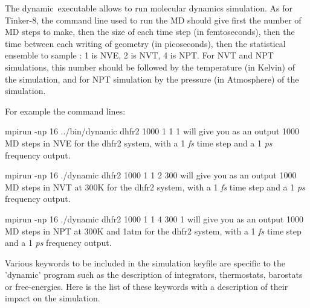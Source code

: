 The {\ttfamily dynamic} executable allows to run molecular dynamics simulation. As for Tinker-\/8, the command line used to run the M\-D should give first the number of M\-D steps to make, then the size of each time step (in femtoseconds), then the time between each writing of geometry (in picoseconds), then the statistical ensemble to sample \-: 1 is N\-V\-E, 2 is N\-V\-T, 4 is N\-P\-T. For N\-V\-T and N\-P\-T simulations, this number should be followed by the temperature (in Kelvin) of the simulation, and for N\-P\-T simulation by the pressure (in Atmosphere) of the simulation.

For example the command lines\-:


\begin{DoxyItemize}
\item {\ttfamily mpirun -\/np 16 ../bin/dynamic dhfr2 1000 1 1 1} will give you as an output 1000 M\-D steps in N\-V\-E for the dhfr2 system, with a 1 {\itshape fs} time step and a 1 {\itshape ps} frequency output.
\item {\ttfamily mpirun -\/np 16 ./dynamic dhfr2 1000 1 1 2 300} will give you as an output 1000 M\-D steps in N\-V\-T at 300\-K for the dhfr2 system, with a 1 {\itshape fs} time step and a 1 {\itshape ps} frequency output.
\item {\ttfamily mpirun -\/np 16 ./dynamic dhfr2 1000 1 1 4 300 1} will give you as an output 1000 M\-D steps in N\-P\-T at 300\-K and 1atm for the dhfr2 system, with a 1 {\itshape fs} time step and a 1 {\itshape ps} frequency output.
\end{DoxyItemize}

Various keywords to be included in the simulation keyfile are specific to the 'dynamic' program such as the description of integrators, thermostats, barostats or free-\/energies. Here is the list of these keywords with a description of their impact on the simulation.

